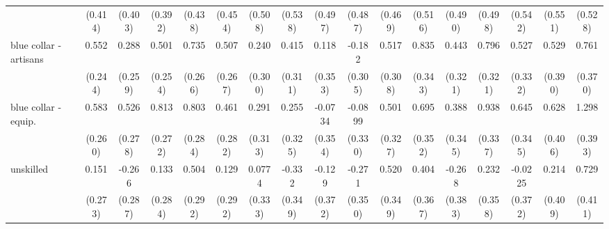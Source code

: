 {\begin{tabular}{l*{16}{c}}
                    &     (0.414)         &     (0.403)         &     (0.392)         &     (0.438)         &     (0.454)         &     (0.508)         &     (0.538)         &     (0.497)         &     (0.487)         &     (0.469)         &     (0.516)         &     (0.490)         &     (0.498)         &     (0.542)         &     (0.551)         &     (0.528)         \\
[1em]
blue collar - artisans&       0.552\sym{*}  &       0.288         &       0.501\sym{*}  &       0.735\sym{**} &       0.507         &       0.240         &       0.415         &       0.118         &      -0.182         &       0.517         &       0.835\sym{*}  &       0.443         &       0.796\sym{*}  &       0.527         &       0.529         &       0.761\sym{*}  \\
                    &     (0.244)         &     (0.259)         &     (0.254)         &     (0.266)         &     (0.267)         &     (0.300)         &     (0.311)         &     (0.353)         &     (0.305)         &     (0.308)         &     (0.343)         &     (0.321)         &     (0.321)         &     (0.332)         &     (0.390)         &     (0.370)         \\
[1em]
blue collar - equip.&       0.583\sym{*}  &       0.526         &       0.813\sym{**} &       0.803\sym{**} &       0.461         &       0.291         &       0.255         &     -0.0734         &     -0.0899         &       0.501         &       0.695\sym{*}  &       0.388         &       0.938\sym{**} &       0.645         &       0.628         &       1.298\sym{***}\\
                    &     (0.260)         &     (0.278)         &     (0.272)         &     (0.284)         &     (0.282)         &     (0.313)         &     (0.325)         &     (0.354)         &     (0.330)         &     (0.327)         &     (0.352)         &     (0.345)         &     (0.337)         &     (0.345)         &     (0.406)         &     (0.393)         \\
[1em]
unskilled           &       0.151         &      -0.266         &       0.133         &       0.504         &       0.129         &      0.0774         &      -0.332         &      -0.129         &      -0.271         &       0.520         &       0.404         &      -0.268         &       0.232         &     -0.0225         &       0.214         &       0.729         \\
                    &     (0.273)         &     (0.287)         &     (0.284)         &     (0.292)         &     (0.292)         &     (0.333)         &     (0.349)         &     (0.372)         &     (0.350)         &     (0.349)         &     (0.367)         &     (0.383)         &     (0.358)         &     (0.372)         &     (0.409)         &     (0.411)         \\

\end{tabular}}

